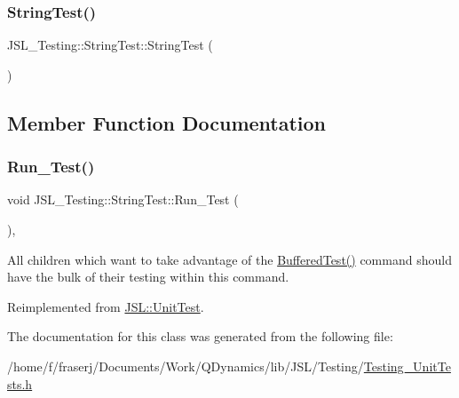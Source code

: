 \subsubsection{\texorpdfstring{String\+Test()}{StringTest()}}
{\footnotesize\ttfamily J\+S\+L\+\_\+\+Testing\+::\+String\+Test\+::\+String\+Test (\begin{DoxyParamCaption}{ }\end{DoxyParamCaption})\hspace{0.3cm}{\ttfamily [inline]}}



\subsection{Member Function Documentation}
\mbox{\label{classJSL__Testing_1_1StringTest_ada0409cd10e3f09788994a9115331ff7}} 
\subsubsection{\texorpdfstring{Run\+\_\+\+Test()}{Run\_Test()}}
{\footnotesize\ttfamily void J\+S\+L\+\_\+\+Testing\+::\+String\+Test\+::\+Run\+\_\+\+Test (\begin{DoxyParamCaption}{ }\end{DoxyParamCaption})\hspace{0.3cm}{\ttfamily [inline]}, {\ttfamily [virtual]}}



All children which want to take advantage of the \hyperlink{classJSL_1_1UnitTest_aabec19b081be8a428f12e4b5e3dc2a9c}{Buffered\+Test()} command should have the bulk of their testing within this command. 



Reimplemented from \hyperlink{classJSL_1_1UnitTest_aa8369ab1ce2a537bff2ea7e1c8818490}{J\+S\+L\+::\+Unit\+Test}.



The documentation for this class was generated from the following file\+:\begin{DoxyCompactItemize}
\item 
/home/f/fraserj/\+Documents/\+Work/\+Q\+Dynamics/lib/\+J\+S\+L/\+Testing/\hyperlink{Testing__UnitTests_8h}{Testing\+\_\+\+Unit\+Tests.\+h}\end{DoxyCompactItemize}
